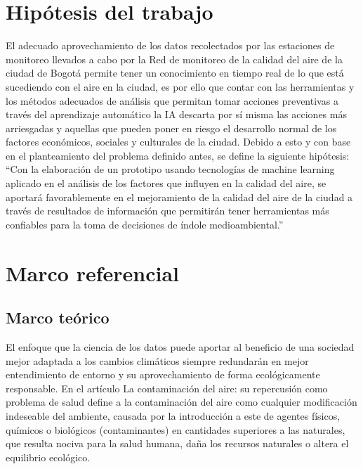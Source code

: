 \section{Hipótesis del trabajo}

El adecuado aprovechamiento de los datos recolectados por las estaciones de monitoreo llevados a cabo por la Red de monitoreo de la calidad del aire de la ciudad de Bogotá permite tener un conocimiento en tiempo real de lo que está sucediendo con el aire en la ciudad, es por ello que contar con las herramientas y los métodos adecuados de análisis que permitan tomar acciones preventivas a través del aprendizaje automático la IA descarta por sí misma las acciones más arriesgadas y aquellas que pueden poner en riesgo el desarrollo normal de los factores económicos, sociales y culturales de la ciudad.
Debido a esto y con base en el planteamiento del problema definido antes, se define la siguiente hipótesis: “Con la elaboración de un prototipo usando tecnologías de machine learning aplicado en el análisis de los factores que influyen en la calidad del aire, se aportará favorablemente en el mejoramiento de la calidad del aire de la ciudad a través de resultados de información que permitirán tener herramientas más confiables para la toma de decisiones de índole medioambiental.”

\section{Marco referencial}

\subsection{Marco teórico}

El enfoque que la ciencia de los datos puede aportar al beneficio de una sociedad mejor adaptada a los cambios climáticos siempre redundarán en mejor entendimiento de entorno y su aprovechamiento de forma ecológicamente responsable.
En el artículo La contaminación del aire: su repercusión como problema de salud define a la contaminación del aire como cualquier modificación indeseable del ambiente, causada por la introducción a este de agentes físicos, químicos o biológicos (contaminantes) en cantidades superiores a las naturales, que resulta nociva para la salud humana, daña los recursos naturales o altera el equilibrio ecológico. \cite{ROMEROPLACERES2006}

